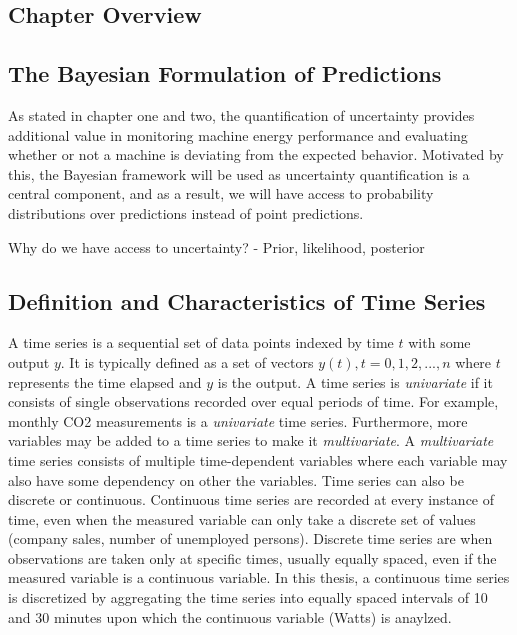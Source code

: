 \subsection{Chapter Overview}

\subsection{The Bayesian Formulation of Predictions}

As stated in chapter one and two, the quantification of uncertainty provides additional value in monitoring machine energy performance and evaluating whether or not a machine is deviating from the expected behavior. Motivated by this, the Bayesian framework will be used as uncertainty quantification is a central component, and as a result, we will have access to probability distributions over predictions instead of point predictions.

Why do we have access to uncertainty?
 - Prior, likelihood, posterior
 

\subsection{Definition and Characteristics of Time Series}

A time series is a sequential set of data points indexed by time $t$ with some output $y$. It is typically defined as a set of vectors $y(t), t = 0, 1, 2,. . .,n$ where $t$ represents the time elapsed and $y$ is the output. A time series is \textit{univariate} if it consists of single observations recorded over equal periods of time. For example, monthly CO2 measurements is a \textit{univariate} time series. Furthermore, more variables may be added to a time series to make it \textit{multivariate}. A \textit{multivariate} time series consists of multiple time-dependent variables where each variable may also have some dependency on other the variables. Time series can also be discrete or continuous. Continuous time series are recorded at every instance of time, even when the measured variable can only take a discrete set of values (company sales, number of unemployed persons). Discrete time series are when observations are taken only at specific times, usually equally spaced, even if the measured variable is a continuous variable. In this thesis, a continuous time series is discretized by aggregating the time series into equally spaced intervals of 10 and 30 minutes upon which the continuous variable (Watts) is anaylzed. 


